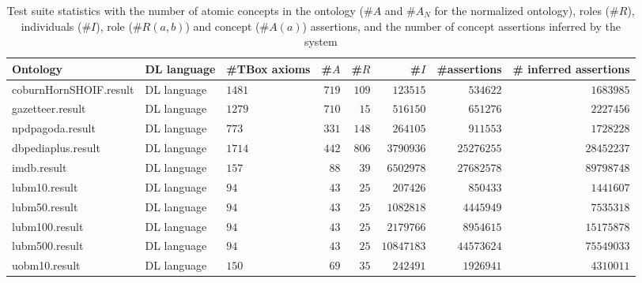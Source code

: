 \documentclass{llncs}
\begin{document}
\newcommand{\rb}[1]{\raisebox{1.5ex}[-1.5ex]{#1}}
\begin{table*}[tb]
  \caption{Test suite statistics with the number of atomic concepts
    in the ontology (\#$A$ and \#$A_N$ for the normalized ontology), roles (\#$R$), individuals (\#$I$), role 
    (\#$R(a, b)$) and concept (\#$A(a)$) assertions, and the number of 
    concept assertions inferred by the system\label{tab:evalontologymetrics}}
    \begin{center}
      \begin{tabular}{|l|l|l| r| r| r| r  || r |}
        \hline
        Ontology & DL language & \#TBox axioms& \#$A$ & \#$R$ & \#$I$ &
                                                                        \#assertions &\# inferred assertions\\
        \hline\hline
        
        coburnHornSHOIF.result & DL language  &$1481$  &$719$  &$109$  &$123515$  &$534622$  &$1683985$   \\ 

gazetteer.result & DL language  &$1279$  &$710$  &$15$  &$516150$  &$651276$  &$2227456$   \\ 

npdpagoda.result & DL language  &$773$  &$331$  &$148$  &$264105$  &$911553$  &$1728228$   \\ 

dbpediaplus.result & DL language  &$1714$  &$442$  &$806$  &$3790936$  &$25276255$  &$28452237$   \\ 

imdb.result & DL language  &$157$  &$88$  &$39$  &$6502978$  &$27682578$  &$89798748$   \\ 

lubm10.result & DL language  &$94$  &$43$  &$25$  &$207426$  &$850433$  &$1441607$   \\ 

lubm50.result & DL language  &$94$  &$43$  &$25$  &$1082818$  &$4445949$  &$7535318$   \\ 

lubm100.result & DL language  &$94$  &$43$  &$25$  &$2179766$  &$8954615$  &$15175878$   \\ 

lubm500.result & DL language  &$94$  &$43$  &$25$  &$10847183$  &$44573624$  &$75549033$   \\ 

uobm10.result & DL language  &$150$  &$69$  &$35$  &$242491$  &$1926941$  &$4310011$   \\ 


\end{tabular}
\end{center}
\end{table*}
\end{document}

